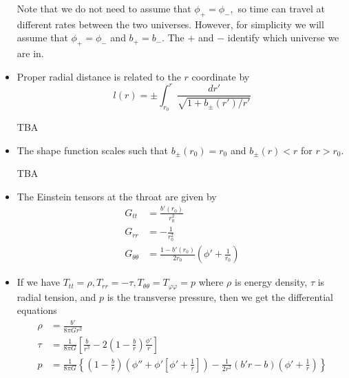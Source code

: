 \documentclass{article}
\numberwithin{equation}{section}
\begin{document}
\begin{itemize}
    Note that we do not need to assume that $\phi_+ = \phi_-,$ so time can travel at different rates between the two universes. However, for simplicity we will assume that $\phi_+ = \phi_-$ and $b_+ = b_-.$ The $+$ and $-$ identify which universe we are in.
    \item Proper radial distance is related to the $r$ coordinate by 
    \begin{equation}
        l(r) = \pm \int_{r_0}^{r} \frac{dr'}{\sqrt{1+b_{\pm}(r')/r'}}
    \end{equation}
    \begin{prooof}
        TBA
    \end{prooof}
    \item The shape function scales such that $b_{\pm}(r_0) = r_0$ and $b_{\pm}(r) < r$ for $r > r_0.$
    \begin{prooof}
        TBA
    \end{prooof}
    \item The Einstein tensors at the throat are given by 
    \begin{align*}
        G_{tt} &= \frac{b'(r_0)}{r_0^2} \\ 
        G_{rr} &= -\frac{1}{r_0^2} \\ 
        G_{\theta\theta} &= \frac{1-b'(r_0)}{2r_0}\left(\phi' + \frac{1}{r_0}\right)
    \end{align*}
    \begin{prooof}
        
    \end{prooof}
    \item If we have $T_{tt} = \rho,T_{rr}=-\tau,T_{\theta\theta}=T_{\varphi\varphi} = p$ where $\rho$ is energy density, $\tau$ is radial tension, and $p$ is the transverse pressure, then we get the differential equations
    \begin{align*}
        \rho &= \frac{b'}{8\pi G r^2} \\ 
        \tau &= \frac{1}{8\pi G} \left[\frac{b}{r^3} -2\left(1-\frac{b}{r}\right)\frac{\phi'}{r}\right] \\ 
        p &= \frac{1}{8\pi G}\left\{\left(1 - \frac{b}{r}\right)\left(\phi'' + \phi'\left[\phi' + \frac{1}{r}\right]\right) - \frac{1}{2r^2}(b'r-b)\left(\phi' + \frac{1}{r}\right)\right\}
    \end{align*}
    \begin{prooof}
        

\end{prooof}
\end{itemize}
\end{document}
